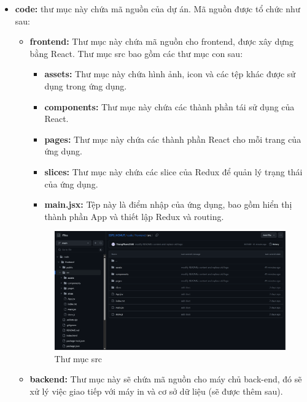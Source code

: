 \begin{itemize}
\begin{itemize}
\end{itemize}
\item \textbf{code:} thư mục này chứa mã nguồn của dự án. Mã nguồn được tổ chức như sau:
\begin{itemize}
    \item \textbf{frontend:} Thư mục này chứa mã nguồn cho frontend, được xây dựng bằng React. Thư mục src bao gồm các thư mục con sau:
    \begin{itemize}
        \item \textbf{assets:} Thư mục này chứa hình ảnh, icon và các tệp khác được sử dụng trong ứng dụng.
        \item \textbf{components:} Thư mục này chứa các thành phần tái sử dụng của React.
        \item \textbf{pages:} Thư mục này chứa các thành phần React cho mỗi trang của ứng dụng.
        \item \textbf{slices:} Thư mục này chứa các slice của Redux để quản lý trạng thái của ứng dụng.
        \item \textbf{main.jsx:} Tệp này là điểm nhập của ứng dụng, bao gồm hiển thị thành phần App và thiết lập Redux và routing.
    \end{itemize}
    \begin{figure}[H]
        \begin{center}
            \includegraphics[width=1\textwidth]{Images/Github/github-src.png}
            \caption{Thư mục src}
        \end{center}
    \end{figure}
    \item \textbf{backend:} Thư mục này sẽ chứa mã nguồn cho máy chủ back-end, đó sẽ xử lý việc giao tiếp với máy in và cơ sở dữ liệu (sẽ được thêm sau).
    \end{itemize}
\end{itemize}

